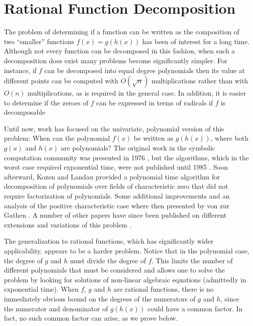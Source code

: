 \chapter{Rational Function Decomposition}
\label{RatDecomp:Chap}

The problem of determining if a function can be written as the
composition of two ``smaller'' functions $f(x) = g(h(x))$ has been of
interest for a long time.  Although not every function can be
decomposed in this fashion, when such a decomposition does exist many
problems become significantly simpler.  For instance, if $f$ can be
decomposed into equal degree polynomials then its value at different
points can be computed with $O(\sqrt{n})$ multiplications rather than
with $O(n)$ multiplications, as is required in the general case.  In
addition, it is easier to determine if the zeroes of $f$ can be
expressed in terms of radicals if $f$ is decomposable

Until now, work has focused on the univariate, polynomial version of
this problem: When can the polynomial $f(x)$ be written as $g(h(x))$,
where both $g(x)$ and $h(x)$ are polynomials?  The original work in
the symbolic computation community was presented in 1976
\cite{Barton76}, but the algorithms, which in the worst case
required exponential time, were not published until 1985
\cite{Barton85}.  Soon afterward, Kozen and Landau
\cite{Kozen89} provided a polynomial time algorithm for
decomposition of polynomials over fields of characteristic zero that
did not require factorization of polynomials.  Some additional
improvements and an analysis of the positive characteristic case where
then presented by von zur Gathen \cite{Gathen87,Gathen90a}. A number
of other papers have since been published on different extensions and
variations of this problem
\cite{Alagar85,Gutierrez89,Dickerson89a,Dickerson89b}. 

The generalization to rational functions, which has significantly
wider applicability, appears to be a harder problem.  Notice that in
the polynomial case, the degree of $g$ and $h$ must divide the degree
of $f$.  This limits the number of different polynomials that must be
considered and allows one to solve the problem by looking for
solutions of non-linear algebraic equations (admittedly in exponential
time).  When $f$, $g$ and $h$ are rational functions, there is no
immediately obvious bound on the degrees of the numerators of $g$ and
$h$, since the numerator and denominator of $g(h(x))$ could have a
common factor.  In fact, no such common factor can arise, as we prove
below.

